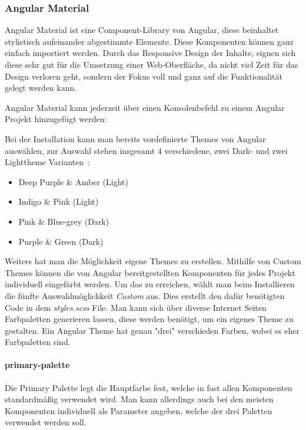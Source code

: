 \cite{rendering-engine-ivy, incremental-dom}

\cleardoublepage

\subsubsection{Angular Material}
Angular Material ist eine Component-Library von Angular, diese beinhaltet stylistisch aufeinander abgestimmte Elemente.
Diese Komponenten können ganz einfach importiert werden. Durch das Responsive Design der Inhalte, eignen sich diese sehr gut
für die Umsetzung einer Web-Oberfläche, da nicht viel Zeit für das Design verloren geht, sondern der Fokus voll und ganz
auf die Funktionalität gelegt werden kann.

Angular Material kann jederzeit über einen Konsolenbefehl zu einem Angular Projekt hinzugefügt werden:
\begin{center}
\end{center}

Bei der Installation kann man bereits vordefinierte Themes von Angular auswählen, zur Auswahl stehen insgesamt 4 verschiedene,
zwei Dark- und zwei Lighttheme Varianten~\cite{angular-material-predefined-themes}:

\begin{itemize}
    \item Deep Purple \& Amber (Light)
    \item Indigo \& Pink (Light)
    \item Pink \& Blue-grey (Dark)
    \item Purple \& Green (Dark)
\end{itemize}

Weiters hat man die Möglichkeit eigene Themes zu erstellen.
Mithilfe von Custom Themes können die von Angular bereitgestellten Komponenten für jedes Projekt individuell eingefärbt werden.
Um das zu erreichen, wählt man beim Installieren die fünfte Auswahlmöglichkeit \emph{Custom} aus.
Dies erstellt den dafür benötigten Code in dem \emph{styles.scss} File.
Man kann sich über diverse Internet Seiten Farbpaletten generieren lassen, diese werden benötigt, um ein eigenes Theme zu gestalten.
Ein Angular Theme hat genau "drei" verschieden Farben, wobei es eher Farbpaletten sind.

\paragraph{primary-palette}
Die Primary Palette legt die Hauptfarbe fest, welche in fast allen Komponenten standardmäßig verwendet wird.
Man kann allerdings auch bei den meisten Komponenten individuell als Parameter angeben, welche der drei Paletten verwendet werden soll.


